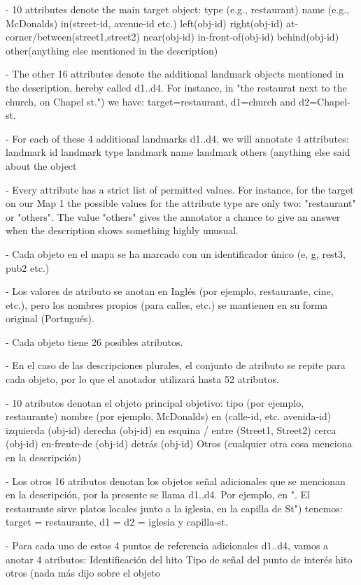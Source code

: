 - 10 attributes denote the main target object: 
  type (e.g., restaurant)
  name (e.g., McDonalds)
  in(street-id, avenue-id etc.)
  left(obj-id)
  right(obj-id)
  at-corner/between(street1,street2)
  near(obj-id)
  in-front-of(obj-id)
  behind(obj-id)
  other(anything else mentioned in the description)

- The other 16 attributes denote the additional landmark objects mentioned in the description, hereby called d1..d4. For instance, in "the restaurat next to the church, on Chapel st.") we have: target=restaurant, d1=church and d2=Chapel-st.

- For each of these 4 additional landmarks d1..d4, we will annotate 4 attributes:
  landmark id
  landmark type
  landmark name
  landmark others (anything else said about the object

- Every attribute has a strict list of permitted values. For instance, for the target on our Map 1 the possible values for the attribute type are only two: "restaurant" or "others". The value "others" gives the annotator a chance to give an answer when the description shows something highly unusual. 


- Cada objeto en el mapa se ha marcado con un identificador \'unico (e, g, rest3, pub2 etc.)

- Los valores de atributo se anotan en Ingl\'es (por ejemplo, restaurante, cine, etc.), pero los nombres propios (para calles, etc.) se mantienen en su forma original (Portugu\'es).

- Cada objeto tiene 26 posibles atributos.

- En el caso de las descripciones plurales, el conjunto de atributo se repite para cada objeto, por lo que el anotador utilizar\'a hasta 52 atributos.

- 10 atributos denotan el objeto principal objetivo:
  tipo (por ejemplo, restaurante)
  nombre (por ejemplo, McDonalds)
  en (calle-id, etc. avenida-id)
  izquierda (obj-id)
  derecha (obj-id)
  en esquina / entre (Street1, Street2)
  cerca (obj-id)
  en-frente-de (obj-id)
  detr\'as (obj-id)
  Otros (cualquier otra cosa menciona en la descripci\'on)

- Los otros 16 atributos denotan los objetos se\~nal adicionales que se mencionan en la descripci\'on, por la presente se llama d1..d4. Por ejemplo, en ". El restaurante sirve platos locales junto a la iglesia, en la capilla de St") tenemos: target = restaurante, d1 = d2 = iglesia y capilla-st.

- Para cada uno de estos 4 puntos de referencia adicionales d1..d4, vamos a anotar 4 atributos:
  Identificaci\'on del hito
  Tipo de se\~nal
  del punto de inter\'es
  hito otros (nada m\'as dijo sobre el objeto

